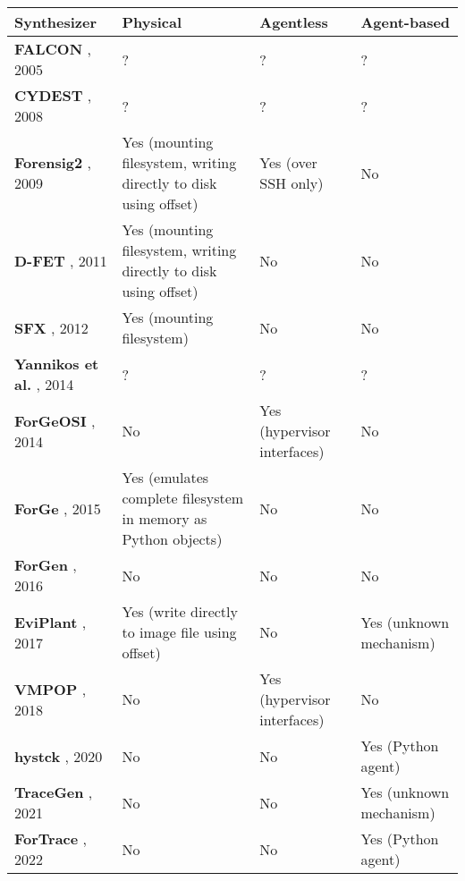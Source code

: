 \documentclass[letterpaper,12pt]{report}
\begin{document}
\begin{longtable}[]{@{}
  >{\raggedright\arraybackslash}p{}
  >{\raggedright\arraybackslash}p{}
  >{\raggedright\arraybackslash}p{}
  >{\raggedright\arraybackslash}p{}@{}}
\toprule\noalign{}
\begin{minipage}[b]{\linewidth}\raggedright
Synthesizer
\end{minipage} & \begin{minipage}[b]{\linewidth}\raggedright
Physical
\end{minipage} & \begin{minipage}[b]{\linewidth}\raggedright
Agentless
\end{minipage} & \begin{minipage}[b]{\linewidth}\raggedright
Agent-based
\end{minipage} \\
\midrule\noalign{}
\endhead
\bottomrule\noalign{}
\endlastfoot
\textbf{FALCON} \cite{adelsteinAutomaticallyCreatingRealistic2005},
2005 & ? & ? & ? \\
\textbf{CYDEST} \cite{bruecknerAutomatedComputerForensics2008}, 2008
& ? & ? & ? \\
\textbf{Forensig2}
\cite{mochForensicImageGenerator2009,mochEvaluatingForensicImage2012},
2009 & Yes (mounting filesystem, writing directly to disk using offset)
& Yes (over SSH only) & No \\
\textbf{D-FET} \cite{williamCloudbasedDigitalForensics2011}, 2011 &
Yes (mounting filesystem, writing directly to disk using offset) & No &
No \\
\textbf{SFX} \cite{russellForensicImageDescription2012}, 2012 & Yes
(mounting filesystem) & No & No \\
\textbf{Yannikos et al.} \cite{yannikosDataCorporaDigital2014}, 2014
& ? & ? & ? \\
\textbf{ForGeOSI} \cite{maxfraggMaxfraggForGeOSI2023}, 2014 & No &
Yes (hypervisor interfaces) & No \\
\textbf{ForGe} \cite{vistiAutomaticCreationComputer2015}, 2015 & Yes
(emulates complete filesystem in memory as Python objects) & No & No \\
\textbf{ForGen} \cite{jjk422Jjk422ForGen2019}, 2016 & No & No &
No \\
\textbf{EviPlant} \cite{scanlonEviPlantEfficientDigital2017}, 2017 &
Yes (write directly to image file using offset) & No & Yes (unknown
mechanism) \\
\textbf{VMPOP} \cite{parkTREDEVMPOPCultivating2018}, 2018 & No & Yes
(hypervisor interfaces) & No \\
\textbf{hystck} \cite{gobelNovelApproachGenerating2020}, 2020 & No &
No & Yes (Python agent) \\
\textbf{TraceGen} \cite{duTraceGenUserActivity2021}, 2021 & No & No
& Yes (unknown mechanism) \\
\textbf{ForTrace} \cite{gobelForTraceHolisticForensic2022}, 2022 &
No & No & Yes (Python agent) \\
\end{longtable}
\end{document}

